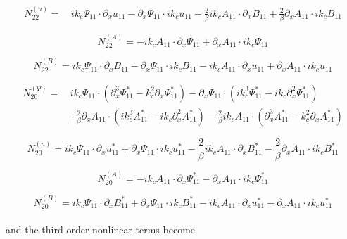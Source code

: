 \documentclass{emulateapj}
\newcommand{\beq}{\begin{equation}}
\newcommand{\eeq}{\end{equation}}
\begin{document}
\beq
\begin{split}
N_{22}^{(u)} = & \, i k_c \Psi_{11} \cdot \partial_x u_{11} - \partial_x \Psi_{11} \cdot i k_c u_{11} - \frac{2}{\beta} i k_c A_{11} \cdot \partial_x B_{11} + \frac{2}{\beta} \partial_x A_{11} \cdot i k_c B_{11}
\end{split}
\eeq

\beq
N_{22}^{(A)} = - i k_c A_{11} \cdot \partial_x \Psi_{11} + \partial_x A_{11} \cdot i k_c \Psi_{11}
\eeq

\beq
N_{22}^{(B)} = i k_c \Psi_{11} \cdot \partial_x B_{11} - \partial_x \Psi_{11} \cdot i k_c B_{11} - i k_c A_{11} \cdot \partial_x u_{11} + \partial_x A_{11} \cdot i k_c u_{11}
\eeq

\beq
\begin{split}
N_{20}^{(\Psi)} = & \, i k_c \Psi_{11} \cdot \left(\partial_x^3 \Psi_{11}^* - k_c^2 \partial_x \Psi_{11}^*\right) - \partial_x \Psi_{11} \cdot \left(i k_c^3 \Psi_{11}^* - i k_c \partial_x^2 \Psi_{11}^*\right) \\
& +\frac{2}{\beta} \partial_x A_{11} \cdot \left(i k_c^3 A_{11}^* - i k_c \partial_x^2 A_{11}^* \right) - \frac{2}{\beta} i k_c A_{11} \cdot \left(\partial_x^3 A_{11}^* - k_c^2 \partial_x A_{11}^*\right)
\end{split}
\eeq

\beq
N_{20}^{(u)} = i k_c \Psi_{11} \cdot \partial_x u_{11}^* + \partial_x \Psi_{11} \cdot i k_c u_{11}^* - \frac{2}{\beta} i k_c A_{11} \cdot \partial_x B_{11}^* - \frac{2}{\beta} \partial_x A_{11} \cdot i k_c B_{11}^*
\eeq

\beq
N_{20}^{(A)} = - i k_c A_{11} \cdot \partial_x \Psi_{11}^* - \partial_x A_{11} \cdot i k_c \Psi_{11}^*
\eeq

\beq
N_{20}^{(B)} = i k_c \Psi_{11} \cdot \partial_x B_{11}^* + \partial_x \Psi_{11} \cdot i k_c B_{11}^* - i k_c A_{11} \cdot \partial_x u_{11}^* - \partial_x A_{11} \cdot i k_c u_{11}^*
\eeq \\

and the third order nonlinear terms become \\
\end{document}
